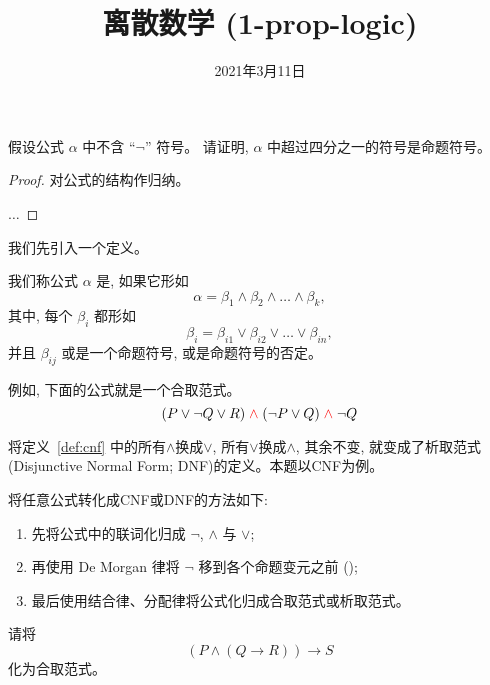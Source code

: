 \documentclass[a4paper, justified]{tufte-handout}
\title{离散数学 (1-prop-logic)}
\date{2021年3月11日}
\begin{document}
\maketitle
\noplagiarism %
\begin{abstract}
\end{abstract}
\beginrequired
\begin{problem}
  假设公式 $\alpha$ 中不含 ``$\lnot$'' 符号。
  请证明, $\alpha$ 中超过四分之一的符号是命题符号。
\end{problem}

\begin{proof}
  对公式的结构作归纳。

  $\dots$
\end{proof}

\begin{problem}
  我们先引入一个定义。

  \begin{definition}
    \label{def:cnf}
    我们称公式 $\alpha$ 是, 如果它形如
    \[
      \alpha = \beta_{1} \land \beta_{2} \land \dots \land \beta_{k},
    \]
    其中, 每个 $\beta_{i}$ 都形如
    \[
      \beta_{i} = \beta_{i1} \lor \beta_{i2} \lor \dots \lor \beta_{in},
    \]
    并且 $\beta_{ij}$ 或是一个命题符号, 或是命题符号的否定。
  \end{definition}

  例如, 下面的公式就是一个合取范式。
  \[
    (P \lor \lnot Q \lor R) \;\textcolor{red}{\land}\; (\lnot P \lor Q) \;\textcolor{red}{\land}\; \lnot Q
  \]

  将定义~\ref{def:cnf} 中的所有$\land$换成$\lor$, 所有$\lor$换成$\land$, 其余不变,
  就变成了析取范式 (Disjunctive Normal Form; DNF)的定义。本题以CNF为例。

  将任意公式转化成CNF或DNF的方法如下:
  \begin{enumerate}[(1)]
    \item 先将公式中的联词化归成 $\lnot$, $\land$ 与 $\lor$;
    \item 再使用 De Morgan 律将 $\lnot$ 移到各个命题变元之前 ();
    \item 最后使用结合律、分配律将公式化归成合取范式或析取范式。
  \end{enumerate}

  请将
  \[
    (P \land (Q \to R)) \to S
  \]
  化为合取范式。
\end{problem}
\end{document}
